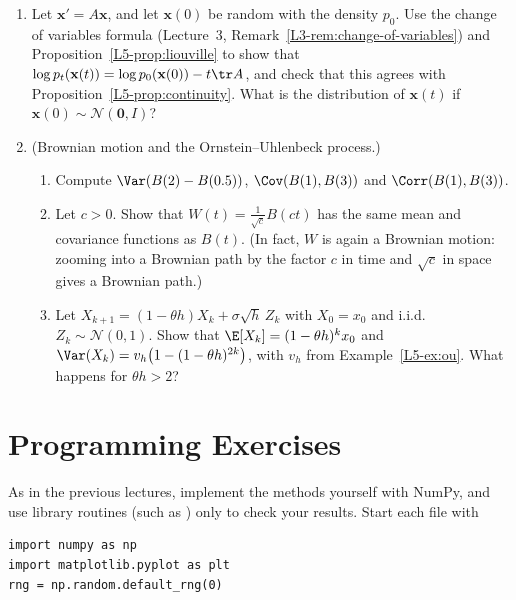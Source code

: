 \begin{enumerate}[leftmargin=*]
    \item Let $\mathbf{x}' = A\mathbf{x}$, and let $\mathbf{x}(0)$ be random with the density $p_0$. Use the change of variables formula (Lecture~3, Remark~\ref{L3-rem:change-of-variables}) and Proposition~\ref{L5-prop:liouville} to show that $\log p_t(\mathbf{x}(t)) = \log p_0(\mathbf{x}(0)) - t\tr A$, and check that this agrees with Proposition~\ref{L5-prop:continuity}. What is the distribution of $\mathbf{x}(t)$ if $\mathbf{x}(0) \sim \mathcal{N}(\mathbf{0}, I)$?
    \item (Brownian motion and the Ornstein--Uhlenbeck process.)
    \begin{enumerate}[label=(\alph*)]
        \item Compute $\Var(B(2) - B(0.5))$, $\Cov(B(1), B(3))$ and $\Corr(B(1), B(3))$.
        \item Let $c > 0$. Show that $W(t) = \frac{1}{\sqrt{c}}B(ct)$ has the same mean and covariance functions as $B(t)$. (In fact, $W$ is again a Brownian motion: zooming into a Brownian path by the factor $c$ in time and $\sqrt{c}$ in space gives a Brownian path.)
        \item Let $X_{k+1} = (1 - \theta h)X_k + \sigma\sqrt{h}\,Z_k$ with $X_0 = x_0$ and i.i.d.\ $Z_k \sim \mathcal{N}(0, 1)$. Show that $\E[X_k] = (1 - \theta h)^kx_0$ and $\Var(X_k) = v_h\big(1 - (1 - \theta h)^{2k}\big)$, with $v_h$ from Example~\ref{L5-ex:ou}. What happens for $\theta h > 2$?
    \end{enumerate}
\end{enumerate}

\section{Programming Exercises}\label{L5-sec:programming}

\setlength{\emergencystretch}{3em}

As in the previous lectures, implement the methods yourself with NumPy, and use library routines (such as ) only to check your results. Start each file with
\begin{lstlisting}
import numpy as np
import matplotlib.pyplot as plt
rng = np.random.default_rng(0)
\end{lstlisting}

